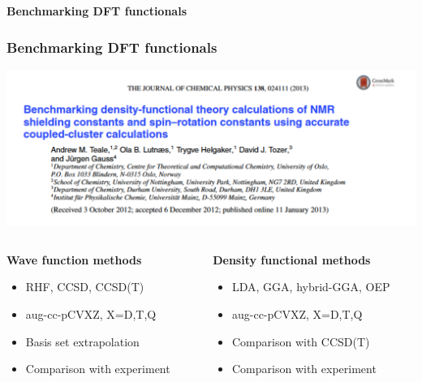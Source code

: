 \begin{frame}
    \centering
    \textbf{\Large{Benchmarking DFT functionals}}
\end{frame}

\begin{frame}
\frametitle{Benchmarking DFT functionals}
\centering
\includegraphics[scale=0.35]{figures/Teale_etal_2013.pdf}

\vspace{10mm}

\begin{columns}
\begin{column}[b]{0.5\textwidth}
    \textbf{Wave function methods}
    \begin{itemize}
        \item   RHF, CCSD, CCSD(T)
        \item   aug-cc-pCVXZ, X=D,T,Q
        \item   Basis set extrapolation
        \item   Comparison with experiment
    \end{itemize}
\end{column}
\begin{column}[b]{0.5\textwidth}
    \textbf{Density functional methods}
    \begin{itemize}
        \item   LDA, GGA, hybrid-GGA, OEP
        \item   aug-cc-pCVXZ, X=D,T,Q
        \item   Comparison with CCSD(T)
        \item   Comparison with experiment
    \end{itemize}
\end{column}
\end{columns}
\end{frame}

